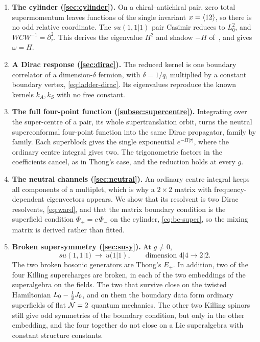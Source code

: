 \begin{enumerate}
\item \textbf{The cylinder (\cref{sec:cylinder}).} On a chiral--antichiral pair, zero total supermomentum leaves functions of the single invariant $x=\langle 12\rangle$, so there is no odd relative coordinate. The $su(1,1|1)$ pair Casimir reduces to $L_0^2$, and $WCW^{-1}=\partial_\tau^2$. This derives the eigenvalue $H^2$ and shadow $-H$ of~\cite{Bulycheva:2018qcp}, and gives $\omega=H$.

\item \textbf{A Dirac response (\cref{sec:dirac}).} The reduced kernel is one boundary correlator of a dimension-$\delta$ fermion, with $\delta=1/q$, multiplied by a constant boundary vertex, \cref{eq:ladder-dirac}. Its eigenvalues reproduce the known kernels $k_A,k_S$ with no free constant.

\item \textbf{The full four-point function (\cref{subsec:supercentre}).} Integrating over the super-centre of a pair, its whole supertranslation orbit, turns the neutral superconformal four-point function into the same Dirac propagator, family by family. Each superblock gives the single exponential $e^{-H|\tau|}$, where the ordinary centre integral gives two. The trigonometric factors in the coefficients cancel, as in Thong's case, and the reduction holds at every $g$.

\item \textbf{The neutral channels (\cref{sec:neutral}).} An ordinary centre integral keeps all components of a multiplet, which is why a $2\times2$ matrix with frequency-dependent eigenvectors appears. We show that its resolvent is two Dirac resolvents, \cref{eq:ward}, and that the matrix boundary condition is the superfield condition $\Phi_+=c\,\Phi_-$ on the cylinder, \cref{eq:bc-super}, so the mixing matrix is derived rather than fitted.

\item \textbf{Broken supersymmetry (\cref{sec:susy}).} At $g\neq0$,
\begin{equation*}
su(1,1|1)\ \longrightarrow\ u(1|1),\qquad\text{dimension }4|4\to2|2.
\end{equation*}
The two broken bosonic generators are Thong's $E_\pm$. In addition, two of the four Killing supercharges are broken, in each of the two embeddings of the superalgebra on the fields. The two that survive close on the twisted Hamiltonian $L_0-\tfrac12 J_0$, and on them the boundary data form ordinary superfields of flat $\mathcal{N}=2$ quantum mechanics. The other two Killing spinors still give odd symmetries of the boundary condition, but only in the other embedding, and the four together do not close on a Lie superalgebra with constant structure constants.


\end{enumerate}
